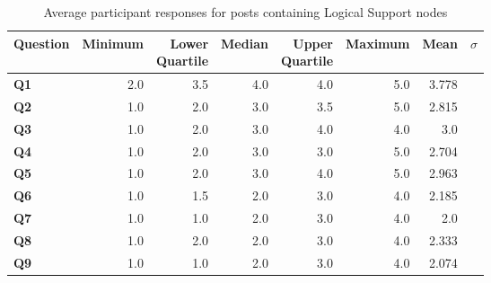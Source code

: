 \begin{table}
\centering
\caption{Average participant responses for posts containing Logical Support nodes}
\label{table:perception:logical-support-average}
\begin{tabular}{ l | r | r | r | r | r | r | r}
\textbf{Question} & \textbf{Minimum} & \pbox{2cm}{\textbf{Lower}\\ \textbf{Quartile}} & \textbf{Median} & \pbox{2cm}{\textbf{Upper}\\ \textbf{Quartile}} & \textbf{Maximum} & \textbf{Mean} & \textbf{$\sigma$}\\
\hline
\textbf{Q1} &  2.0 & 3.5 & 4.0 & 4.0 & 5.0 & 3.778 &  \\
\hline
\textbf{Q2} &  1.0 & 2.0 & 3.0 & 3.5 & 5.0 & 2.815 &  \\
\hline
\textbf{Q3} &  1.0 & 2.0 & 3.0 & 4.0 & 4.0 & 3.0 &  \\
\hline
\textbf{Q4} &  1.0 & 2.0 & 3.0 & 3.0 & 5.0 & 2.704 &  \\
\hline
\textbf{Q5} &  1.0 & 2.0 & 3.0 & 4.0 & 5.0 & 2.963 &  \\
\hline
\textbf{Q6} &  1.0 & 1.5 & 2.0 & 3.0 & 4.0 & 2.185 &  \\
\hline
\textbf{Q7} &  1.0 & 1.0 & 2.0 & 3.0 & 4.0 & 2.0 &  \\
\hline
\textbf{Q8} &  1.0 & 2.0 & 2.0 & 3.0 & 4.0 & 2.333 &  \\
\hline
\textbf{Q9} &  1.0 & 1.0 & 2.0 & 3.0 & 4.0 & 2.074 &  \\
\end{tabular}
\end{table}




